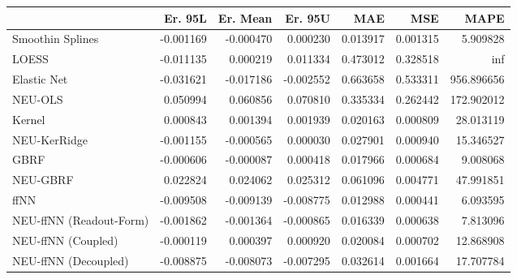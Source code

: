 \begin{tabular}{lrrrrrr}
\toprule
{} &   Er. 95L &  Er. Mean &   Er. 95U &       MAE &       MSE &        MAPE \\
\midrule
Smoothin Splines        & -0.001169 & -0.000470 &  0.000230 &  0.013917 &  0.001315 &    5.909828 \\
LOESS                   & -0.011135 &  0.000219 &  0.011334 &  0.473012 &  0.328518 &         inf \\
Elastic Net             & -0.031621 & -0.017186 & -0.002552 &  0.663658 &  0.533311 &  956.896656 \\
NEU-OLS                 &  0.050994 &  0.060856 &  0.070810 &  0.335334 &  0.262442 &  172.902012 \\
Kernel                  &  0.000843 &  0.001394 &  0.001939 &  0.020163 &  0.000809 &   28.013119 \\
NEU-KerRidge            & -0.001155 & -0.000565 &  0.000030 &  0.027901 &  0.000940 &   15.346527 \\
GBRF                    & -0.000606 & -0.000087 &  0.000418 &  0.017966 &  0.000684 &    9.008068 \\
NEU-GBRF                &  0.022824 &  0.024062 &  0.025312 &  0.061096 &  0.004771 &   47.991851 \\
ffNN                    & -0.009508 & -0.009139 & -0.008775 &  0.012988 &  0.000441 &    6.093595 \\
NEU-ffNN (Readout-Form) & -0.001862 & -0.001364 & -0.000865 &  0.016339 &  0.000638 &    7.813096 \\
NEU-ffNN (Coupled)      & -0.000119 &  0.000397 &  0.000920 &  0.020084 &  0.000702 &   12.868908 \\
NEU-ffNN (Decoupled)    & -0.008875 & -0.008073 & -0.007295 &  0.032614 &  0.001664 &   17.707784 \\
\bottomrule
\end{tabular}
